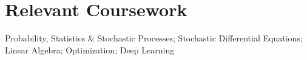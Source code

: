 \section{\sc Relevant Coursework}
\parbox[t]{0.8\textwidth}{
Probability, Statistics \& Stochastic Processes; Stochastic Differential Equations; Linear Algebra; Optimization; Deep Learning
}%
\endinput